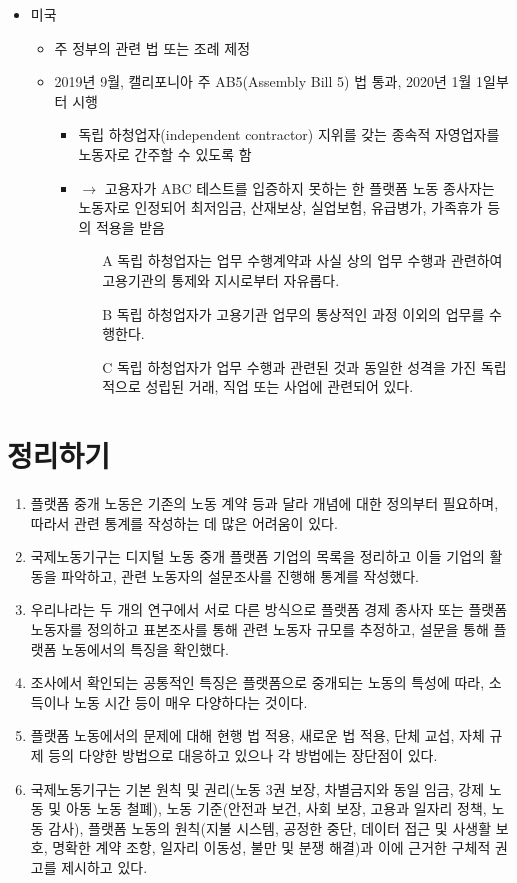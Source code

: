 \begin{itemize}
\item 미국 \cite[7장]{jangjiyeon-ihogeun-joim-yeong-bag-eunjeong-gimgeunju:2020aa}
	\begin{itemize}
	\item 주 정부의 관련 법 또는 조례 제정
	\item 2019년 9월, 캘리포니아 주 AB5(Assembly Bill 5) 법 통과, 2020년 1월 1일부터 시행
		\begin{itemize}
		\item 독립 하청업자(independent contractor) 지위를 갖는 종속적 자영업자를 노동자로 간주할 수 있도록 함
		\item $\rightarrow$ 고용자가 ABC 테스트를 입증하지 못하는 한 플랫폼 노동 종사자는 노동자로 인정되어 최저임금, 산재보상, 실업보험, 유급병가, 가족휴가 등의 적용을 받음
			\begin{itemize}
			\item[A] 독립 하청업자는 업무 수행계약과 사실 상의 업무 수행과 관련하여 고용기관의 통제와 지시로부터 자유롭다.
			\item[B] 독립 하청업자가 고용기관 업무의 통상적인 과정 이외의 업무를 수행한다.
			\item[C] 독립 하청업자가 업무 수행과 관련된 것과 동일한 성격을 가진 독립적으로 성립된 거래, 직업 또는 사업에 관련되어 있다.
			\end{itemize} 
		\end{itemize}
	\end{itemize}
\end{itemize}

\pagebreak

\section*{정리하기}
\begin{enumerate}
\item 플랫폼 중개 노동은 기존의 노동 계약 등과 달라 개념에 대한 정의부터 필요하며, 따라서 관련 통계를 작성하는 데 많은 어려움이 있다.
\item 국제노동기구는 디지털 노동 중개 플랫폼 기업의 목록을 정리하고 이들 기업의 활동을 파악하고, 관련 노동자의 설문조사를 진행해 통계를 작성했다.
\item 우리나라는 두 개의 연구에서 서로 다른 방식으로 플랫폼 경제 종사자 또는 플랫폼 노동자를 정의하고 표본조사를 통해 관련 노동자 규모를 추정하고, 설문을 통해 플랫폼 노동에서의 특징을 확인했다.
\item 조사에서 확인되는 공통적인 특징은 플랫폼으로 중개되는 노동의 특성에 따라, 소득이나 노동 시간 등이 매우 다양하다는 것이다. 
\item 플랫폼 노동에서의 문제에 대해 현행 법 적용, 새로운 법 적용, 단체 교섭, 자체 규제 등의 다양한 방법으로 대응하고 있으나 각 방법에는 장단점이 있다.
\item 국제노동기구는 기본 원칙 및 권리(노동 3권 보장, 차별금지와 동일 임금, 강제 노동 및 아동 노동 철폐), 노동 기준(안전과 보건, 사회 보장, 고용과 일자리 정책, 노동 감사), 플랫폼 노동의 원칙(지불 시스템, 공정한 중단, 데이터 접근 및 사생활 보호, 명확한 계약 조항, 일자리 이동성, 불만 및 분쟁 해결)과 이에 근거한 구체적 권고를 제시하고 있다.
\end{enumerate}